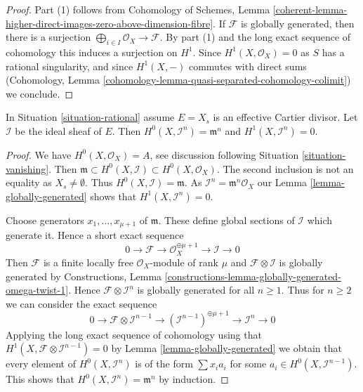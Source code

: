 \begin{proof}
Part (1) follows from  Cohomology of Schemes, Lemma
\ref{coherent-lemma-higher-direct-images-zero-above-dimension-fibre}.
If $\mathcal{F}$ is globally generated, then there is a surjection
$\bigoplus_{i \in I} \mathcal{O}_X \to \mathcal{F}$. By part (1)
and the long exact sequence of cohomology this
induces a surjection on $H^1$. Since $H^1(X, \mathcal{O}_X) = 0$
as $S$ has a rational singularity, and since $H^1(X, -)$ commutes
with direct sums
(Cohomology, Lemma \ref{cohomology-lemma-quasi-separated-cohomology-colimit})
we conclude.
\end{proof}

\begin{lemma}
\label{lemma-sections-powers-I-rational}
In Situation \ref{situation-rational} assume
$E = X_s$ is an effective Cartier divisor.
Let $\mathcal{I}$ be the ideal sheaf of $E$. Then
$H^0(X, \mathcal{I}^n) = \mathfrak m^n$ and
$H^1(X, \mathcal{I}^n) = 0$.
\end{lemma}

\begin{proof}
We have $H^0(X, \mathcal{O}_X) = A$, see discussion following
Situation \ref{situation-vanishing}. Then
$\mathfrak m \subset H^0(X, \mathcal{I}) \subset H^0(X, \mathcal{O}_X)$.
The second inclusion is not an equality as $X_s \not = \emptyset$.
Thus $H^0(X, \mathcal{I}) = \mathfrak m$.
As $\mathcal{I}^n = \mathfrak m^n\mathcal{O}_X$ our
Lemma \ref{lemma-globally-generated} shows that $H^1(X, \mathcal{I}^n) = 0$.

\medskip\noindent
Choose generators $x_1, \ldots, x_{\mu + 1}$ of $\mathfrak m$. These define
global sections of $\mathcal{I}$ which generate it. Hence
a short exact sequence
$$
0 \to \mathcal{F} \to \mathcal{O}_X^{\oplus \mu + 1} \to \mathcal{I} \to 0
$$
Then $\mathcal{F}$ is a finite locally free $\mathcal{O}_X$-module
of rank $\mu$ and $\mathcal{F} \otimes \mathcal{I}$ is globally
generated by Constructions, Lemma
\ref{constructions-lemma-globally-generated-omega-twist-1}.
Hence $\mathcal{F} \otimes \mathcal{I}^n$
is globally generated for all $n \geq 1$. Thus for $n \geq 2$ we can
consider the exact sequence
$$
0 \to \mathcal{F} \otimes \mathcal{I}^{n - 1} \to
(\mathcal{I}^{n - 1})^{\oplus \mu + 1} \to
\mathcal{I}^n \to 0
$$
Applying the long exact sequence of cohomology using that
$H^1(X, \mathcal{F} \otimes \mathcal{I}^{n - 1}) = 0$ by
Lemma \ref{lemma-globally-generated}
we obtain that every
element of $H^0(X, \mathcal{I}^n)$ is of the form $\sum x_i a_i$
for some $a_i \in H^0(X, \mathcal{I}^{n - 1})$. This shows that
$H^0(X, \mathcal{I}^n) = \mathfrak m^n$ by induction.
\end{proof}

